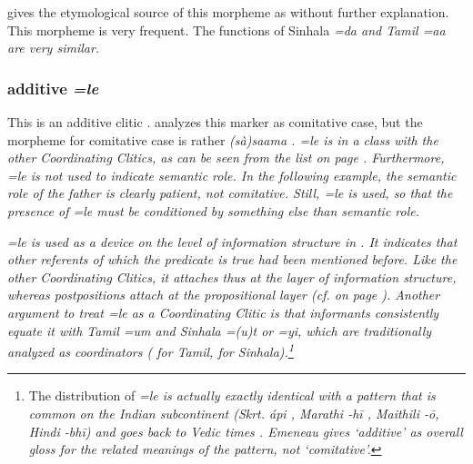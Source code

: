 \citet{Bakker2006} gives the etymological source of this morpheme as  without further explanation. 
This morpheme is very frequent. The functions of Sinhala \em =da \em and Tamil \em =aa \em are very similar.

  

% 




\subsubsection{additive \em =le\em}\label{sec:morph:=le}
This is an additive clitic \citep[cf.][168]{SmithEtAl2006cll}.
\citet {Ansaldo2005ms,Ansaldo2008genesis,Ansaldo2009book}  analyzes this marker as comitative case, but the morpheme for comitative case is rather \em (sà)saama \em {}. \em =le \em is in a class with the other Coordinating Clitics, as can be seen from the list on page  \pageref{page:list:morph:clt}. Furthermore, \em =le \em is not used to indicate semantic role. In the following example, the semantic role of the father is clearly patient, not comitative. Still, \em =le \em is used, so that the presence of \em =le \em must be conditioned by something else than semantic role.

 

\em =le \em is used as a device on the level of information structure in .  It indicates that other referents of which the predicate  is true had been mentioned before. Like the other Coordinating Clitics, it attaches thus at   the layer of information structure, whereas postpositions attach at the propositional layer (cf.  on page \pageref{ex:form:boundwords:stacking}). Another argument to treat \em =le \em as a Coordinating Clitic is that informants consistently equate it with Tamil \em =um \em and Sinhala \em =(u)t \em or \em =yi\em, which are traditionally analyzed as coordinators  (\citet[151]{Lehmann1989} for Tamil, \citet[26]{Karunatillake2004} for Sinhala).\footnote{The distribution of \em =le \em is actually exactly identical with a pattern that is common on the Indian subcontinent (Skrt. \em ápi \em, Marathi \em -h\=i \em, Maithili \em -\=o\em, Hindi \em -bh\=i\em) and goes back to Vedic times \citep{Emeneau1974}. Emeneau gives `additive' as overall gloss for the related meanings of the pattern, not `comitative'.}

